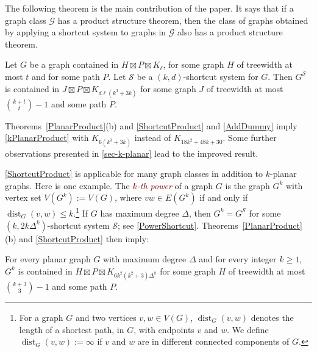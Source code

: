 \documentclass{patmorin}
\newcommand{\defin}[1]{\textcolor{Maroon}{\emph{#1}}}
\newcommand{\note}[2]{\noindent{\color{red}[#1:~#2]}}
\newcommand{\referee}[2]{\noindent\textcolor{blue}{\framebox{\begin{minipage}{\textwidth} Ref \#{#1}: #2\end{minipage}}}}
\DeclareMathOperator{\dist}{dist}
\renewcommand{\SS}{\mathcal{S}}
\renewcommand{\geq}{\geqslant}
\renewcommand{\leq}{\leqslant}
\begin{document}
The following theorem is the main contribution of the paper. It says that if a graph class $\mathcal{G}$ has a product structure theorem, then the class of graphs obtained by applying a shortcut system to graphs in $\mathcal{G}$ also has a product structure theorem.

\begin{thm}
\label{ShortcutProduct}
Let $G$ be a graph contained in $H\boxtimes P \boxtimes K_\ell$, for some graph $H$ of treewidth at most $t$ and for some path $P$. Let $\SS$ be a $(k,d)$-shortcut system for $G$. Then $G^\SS$ is contained in $J\boxtimes P\boxtimes K_{d\ell(k^3+3k)}$ for some graph $J$ of treewidth at most $\binom{k+t}{t}-1$ and some path $P$.
\end{thm}



Theorems~\ref{PlanarProduct}(b) and \ref{ShortcutProduct} and \cref{AddDummy} imply \cref{kPlanarProduct} with $K_{6(k^3+3k)}$ instead of $K_{18k^2+48k+30}$. Some further observations presented in \cref{sec-k-planar} lead to the improved result.

\cref{ShortcutProduct} is applicable for many graph classes in addition to $k$-planar graphs. Here is one example. The \defin{$k$-th power} of a graph $G$ is the graph $G^k$ with vertex set $V(G^k):=V(G)$, where $vw\in E(G^k)$ if and only if $\dist_G(v,w)\leq k$.\footnote{For a graph $G$ and two vertices $v,w\in V(G)$, $\dist_G(v,w)$  denotes the length of a shortest path, in $G$, with endpoints $v$ and $w$.  We define $\dist_G(v,w):=\infty$ if $v$ and $w$ are in different connected components of $G$.} If $G$ has maximum degree $\Delta$, then $G^k = G^\SS$ for some $(k,2k\Delta^{k})$-shortcut system $\SS$; see \cref{PowerShortcut}. Theorems~\ref{PlanarProduct}(b) and \ref{ShortcutProduct} then imply:

\begin{thm}
\label{kPowerBasic}
For every planar graph $G$ with maximum degree $\Delta$ and for every integer $k\geq 1$, $G^k$ is contained in $H\boxtimes P\boxtimes K_{6k^2(k^2+3)\Delta^{k}}$ for some graph $H$ of treewidth at most $\binom{k+3}{3}-1$ and some path $P$.
\end{thm}
\end{document}
